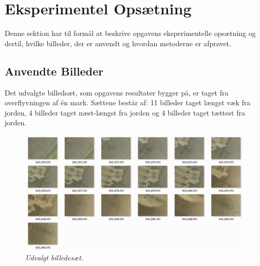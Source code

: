 \chapter{Eksperimentel Opsætning}
Denne sektion har til formål at beskrive opgavens eksperimentelle opsætning og dertil, hvilke billeder, der er anvendt og hvordan metoderne er afprøvet.
\section{Anvendte Billeder}
Det udvalgte billedsæt, som opgavens resultater bygger på, er taget fra overflyvningen af én mark. Sættene består af: 11 billeder taget længst væk fra jorden, 4 billeder taget næst-længst fra jorden og 4 billeder taget tættest fra jorden.
\begin{figure}[H]
    \centering
    \includegraphics[width=1\textwidth]{fig/43.png}
    \vspace{-0.5em}   
    \begin{center}
    \caption{{\footnotesize \textit{Udvalgt billedesæt.}}}
    \label{fig:lindblob}
     \end{center}
  \end{figure}
       \vspace{-2.7em}
\noindent

